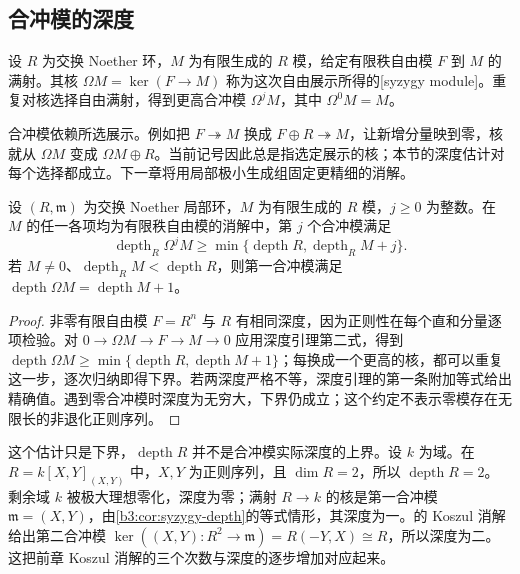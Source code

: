 \subsection{合冲模的深度}
\label{b3:subsec:1603:02}

\begin{definition}\label{b3:def:syzygy-local}
	设 \(R\) 为交换 Noether 环，\(M\) 为有限生成的 \(R\) 模，给定有限秩自由模 \(F\) 到 \(M\) 的满射。其核 \(\Omega M=\ker(F\rightarrow M)\) 称为这次自由展示所得的[syzygy module]。重复对核选择自由满射，得到更高合冲模 \(\Omega^jM\)，其中 \(\Omega^0M=M\)。
\end{definition}

合冲模依赖所选展示。例如把 \(F\twoheadrightarrow M\) 换成 \(F\oplus R\twoheadrightarrow M\)，让新增分量映到零，核就从 \(\Omega M\) 变成 \(\Omega M\oplus R\)。当前记号因此总是指选定展示的核；本节的深度估计对每个选择都成立。下一章将用局部极小生成组固定更精细的消解。

\begin{corollary}\label{b3:cor:syzygy-depth}
	设 \((R,\mathfrak m)\) 为交换 Noether 局部环，\(M\) 为有限生成的 \(R\) 模，\(j\ge0\) 为整数。在 \(M\) 的任一各项均为有限秩自由模的消解中，第 \(j\) 个合冲模满足
	\[
		\operatorname{depth}_R\Omega^jM \ge\min\{\operatorname{depth}R,\operatorname{depth}_RM+j\}.
	\]
	若 \(M\ne0\)、\(\operatorname{depth}_RM<\operatorname{depth}R\)，则第一合冲模满足 \(\operatorname{depth}\Omega M=\operatorname{depth}M+1\)。
\end{corollary}
\begin{proof}
	非零有限自由模 \(F=R^n\) 与 \(R\) 有相同深度，因为正则性在每个直和分量逐项检验。对 \(0\rightarrow\Omega M\rightarrow F\rightarrow M\rightarrow0\) 应用深度引理第二式，得到 \(\operatorname{depth}\Omega M\ge\min\{\operatorname{depth}R,\operatorname{depth}M+1\}\)；每换成一个更高的核，都可以重复这一步，逐次归纳即得下界。若两深度严格不等，深度引理的第一条附加等式给出精确值。遇到零合冲模时深度为无穷大，下界仍成立；这个约定不表示零模存在无限长的非退化正则序列。
\end{proof}

这个估计只是下界，\(\operatorname{depth}R\) 并不是合冲模实际深度的上界。设 \(k\) 为域。在 \(R=k[X,Y]_{(X,Y)}\) 中，\(X,Y\) 为正则序列，且 \(\dim R=2\)，所以 \(\operatorname{depth}R=2\)。剩余域 \(k\) 被极大理想零化，深度为零；满射 \(R\rightarrow k\) 的核是第一合冲模 \(\mathfrak m=(X,Y)\)，由\cref{b3:cor:syzygy-depth}的等式情形，其深度为一。的 Koszul 消解给出第二合冲模 \(\ker((X,Y):R^2\rightarrow\mathfrak m)=R(-Y,X)\cong R\)，所以深度为二。这把前章 Koszul 消解的三个次数与深度的逐步增加对应起来。

